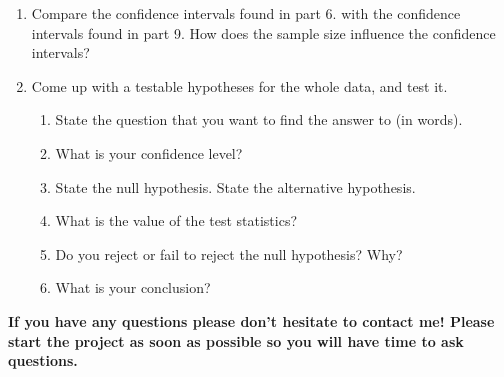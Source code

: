 \documentclass[12pt]{article}
\begin{document}
\begin{enumerate}
\item Compare the confidence intervals found in part 6. with the confidence intervals found in part 9. How does the sample size influence the confidence intervals?
\item Come up with a testable hypotheses for the whole data, and test it.
\begin{enumerate}
\item State the question that you want to find the answer to (in words).
\item What is your confidence level?
\item State the null hypothesis. State the alternative hypothesis.
\item What is the value of the test statistics?
\item Do you reject or fail to reject the null hypothesis? Why?
\item What is your conclusion?
\end{enumerate}
\end{enumerate}

\textbf{If you have any questions please don't hesitate to contact me! Please start the project as soon as possible so you will have time to ask questions.}
\end{document}
